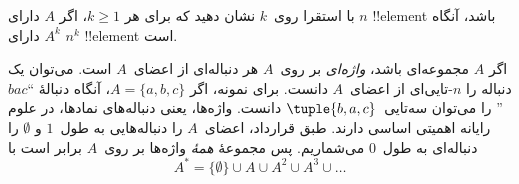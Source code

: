 \documentclass[../../../include/open-logic-section]{subfiles}
\begin{document}
\begin{prob}
با استقرا روی~$k$ نشان دهید که برای هر $k \ge 1$، اگر $A$ دارای
$n$ !!{element} باشد، آنگاه $A^k$ دارای $n^k$ !!{element} است.
\end{prob}

\begin{ex}
اگر $A$ مجموعه‌ای باشد، \emph{واژه‌ای} بر روی~$A$ هر دنباله‌ای از
اعضای~$A$ است. می‌توان یک دنباله را $n$-تایی‌ای از
اعضای~$A$ دانست. برای نمونه، اگر $A = \{a, b, c\}$، آنگاه
دنبالهٔ ``$bac$'' را می‌توان سه‌تایی~$\tuple{b, a, c}$ دانست.
واژه‌ها، یعنی دنباله‌های نمادها، در علوم رایانه اهمیتی اساسی دارند.
طبق قرارداد، اعضای~$A$ را دنباله‌هایی به طول~$1$ و
$\emptyset$ را دنباله‌ای به طول~$0$ می‌شماریم. پس مجموعهٔ
\emph{همهٔ} واژه‌ها بر روی~$A$ برابر است با
\[
A^* = \{\emptyset\} \cup A \cup A^2 \cup A^3 \cup \dots
\]
\end{ex}
\end{document}
